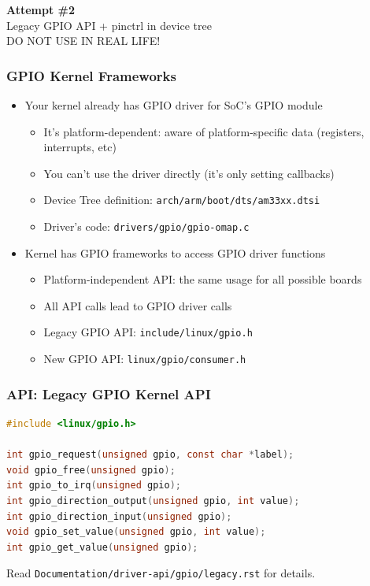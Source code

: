 \documentclass[aspectratio=169,usenames,dvipsnames]{beamer}
\newcounter{cont}
\begin{document}
\begin{frame}[standout]
  \textbf{Attempt \#2} \\
  \vspace{5mm}
  Legacy GPIO API + pinctrl in device tree \\
  \vspace{5mm}
  \alert{DO NOT USE IN REAL LIFE!}
\end{frame}

\begin{frame}
  \frametitle{GPIO Kernel Frameworks}
  \begin{itemize}
    \item Your kernel already has GPIO driver for SoC's GPIO module
      \begin{itemize}
        \item It's platform-dependent: aware of platform-specific data
              (registers, interrupts, etc)
        \item You can't use the driver directly (it's only setting callbacks)
        \item Device Tree definition: \texttt{arch/arm/boot/dts/am33xx.dtsi}
        \item Driver's code: \texttt{drivers/gpio/gpio-omap.c}
      \end{itemize}
    \pause
    \item Kernel has GPIO frameworks to access GPIO driver functions
      \begin{itemize}
        \item Platform-independent API: the same usage for all possible boards
        \item All API calls lead to GPIO driver calls
        \item Legacy GPIO API: \texttt{include/linux/gpio.h}
        \item New GPIO API: \texttt{linux/gpio/consumer.h}
      \end{itemize}
  \end{itemize}
\end{frame}

\begin{frame}[containsverbatim]
  \frametitle{API: Legacy GPIO Kernel API}
  \begin{lstlisting}[language=c,numbers=none]
#include <linux/gpio.h>

int gpio_request(unsigned gpio, const char *label);
void gpio_free(unsigned gpio);
int gpio_to_irq(unsigned gpio);
int gpio_direction_output(unsigned gpio, int value);
int gpio_direction_input(unsigned gpio);
void gpio_set_value(unsigned gpio, int value);
int gpio_get_value(unsigned gpio);
  \end{lstlisting}

  Read \texttt{Documentation/driver-api/gpio/legacy.rst} for details.
\end{frame}
\end{document}
